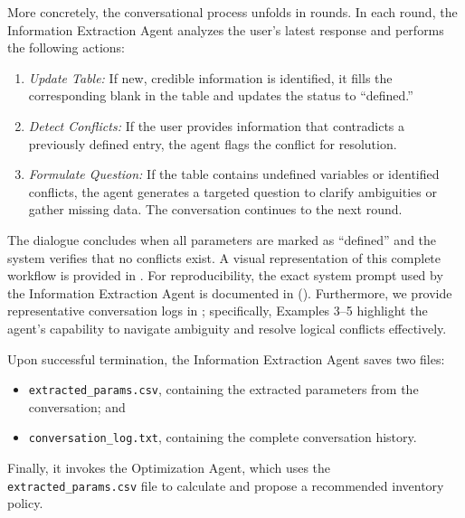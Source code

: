 \documentclass[mnsc,nonblindrev]{informs3_hide}
\begin{document}
    More concretely, the conversational process unfolds in rounds. In each round, the Information Extraction Agent analyzes the user's latest response and performs the following actions:
    \begin{enumerate}
        \item \emph{Update Table:} If new, credible information is identified, it fills the corresponding blank in the table and updates the status to ``defined.''
        \item \emph{Detect Conflicts:} If the user provides information that contradicts a previously defined entry, the agent flags the conflict for resolution.
        \item \emph{Formulate Question:} If the table contains undefined variables or identified conflicts, the agent generates a targeted question to clarify ambiguities or gather missing data. The conversation continues to the next round.
    \end{enumerate}
    The dialogue concludes when all parameters are marked as ``defined'' and the system verifies that no conflicts exist. A visual representation of this complete workflow is provided in .
    For reproducibility, the exact system prompt used by the Information Extraction Agent is documented in  (). Furthermore, we provide representative conversation logs in ; specifically, Examples 3--5 highlight the agent's capability to navigate ambiguity and resolve logical conflicts effectively.

    
    
    
    Upon successful termination, the Information Extraction Agent saves two files: 
    \begin{itemize} 
        \item \texttt{extracted\_params.csv}, containing the extracted parameters from the conversation; and 
        \item \texttt{conversation\_log.txt}, containing the complete conversation history. 
    \end{itemize}
    Finally, it invokes the Optimization Agent, which uses the \texttt{extracted\_params.csv} file to calculate and propose a recommended inventory policy.
\end{document}
